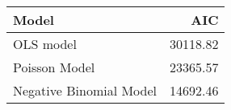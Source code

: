\begin{table}[ht]
\centering
\begin{tabular}{lr}
  \hline
Model & AIC \\ 
  \hline
OLS model & 30118.82 \\ 
  Poisson Model & 23365.57 \\ 
  Negative Binomial Model & 14692.46 \\ 
   \hline
\end{tabular}
\end{table}
